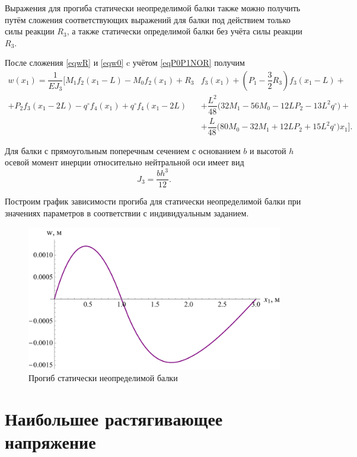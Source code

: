 \documentclass[12pt, a4paper]{article}
\begin{document}
	Выражения для прогиба статически неопределимой балки также можно получить путём сложения соответствующих выражений для балки под действием только силы реакции $R_3$, а также статически определимой балки без учёта силы реакции $R_3$. 
	
	После сложения \eqref{eqwR} и \eqref{eqw0} c учётом \eqref{eqP0P1NOR} получим
	\vspace{-0.25em}
	\begin{equation*}
		\begin{split}
			w(x_1) = \dfrac{1}{E J_3} \bigg[ M_1 f_2(x_1 - L) - M_0 f_2(x_1) + R_3 & f_3(x_1) + \left( P_1 - \dfrac{3}{2} R_3 \right) f_3(x_1 - L) + \\ + P_2 f_3(x_1 - 2L) - q^{\circ} f_4(x_1) + q^{\circ} f_4(x_1 - 2L) & + \dfrac{L^2}{48} \big( 32 M_1 - 56 M_0 - 12L P_2 - 13L^2 q^{\circ} \big) + \\ & + \dfrac{L}{48} \big( 80 M_0 - 32 M_1 + 12L P_2 + 15 L^2 q^{\circ} \big) x_1 \bigg].
		\end{split}
	\end{equation*}
	
	\newpage
	
	Для балки с прямоугольным поперечным сечением с основанием $b$ и высотой $h$ осевой момент инерции относительно нейтральной оси имеет вид
	\[
	J_3 = \dfrac{b h^3}{12}.
	\]
	
	Построим график зависимости прогиба для статически неопределимой балки при значениях параметров в соответствии с индивидуальным заданием.
	
	\begin{figure}[!h]
		\centering
		\includegraphics[width=0.75\linewidth]{plot-12}
		\caption{Прогиб статически неопределимой балки}
	\end{figure}
	
	\section{Наибольшее растягивающее напряжение}
	
\end{document}
